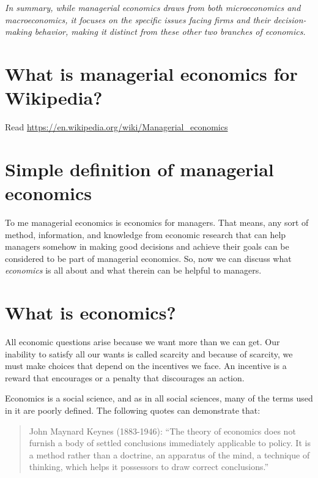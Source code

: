 \documentclass[
  12pt,
  oneside]{book}
\theoremstyle{definition}
\theoremstyle{definition}
\theoremstyle{definition}
\theoremstyle{definition}
\theoremstyle{remark}
\begin{document}
\emph{In summary, while managerial economics draws from both microeconomics and macroeconomics, it focuses on the specific issues facing firms and their decision-making behavior, making it distinct from these other two branches of economics.}

\hypertarget{what-is-managerial-economics-for-wikipedia}{%
\section{What is managerial economics for Wikipedia?}\label{what-is-managerial-economics-for-wikipedia}}

Read \url{https://en.wikipedia.org/wiki/Managerial_economics}

\hypertarget{simple-definition-of-managerial-economics}{%
\section{Simple definition of managerial economics}\label{simple-definition-of-managerial-economics}}

To me managerial economics is economics for managers. That means, any sort of method, information, and knowledge from economic research that can help managers somehow in making good decisions and achieve their goals can be considered to be part of managerial economics. So, now we can discuss what \emph{economics} is all about and what therein can be helpful to managers.

\hypertarget{what-is-economics}{%
\section{What is economics?}\label{what-is-economics}}

All economic questions arise because we want more than we can get. Our inability to satisfy all our wants is called scarcity and because of scarcity, we must make choices that depend on the incentives we face. An incentive is a reward that encourages or a penalty that discourages an action.

Economics is a social science, and as in all social sciences, many of the terms used in it are poorly defined. The following quotes can demonstrate that:

\begin{quote}
John Maynard Keynes (1883-1946): ``The theory of economics does not furnish a body of settled conclusions immediately applicable to policy. It is a method rather than a doctrine, an apparatus of the mind, a technique of thinking, which helps it possessors to draw correct conclusions.'' \citet{Keynes1921Introduction}
\end{quote}
\end{document}

